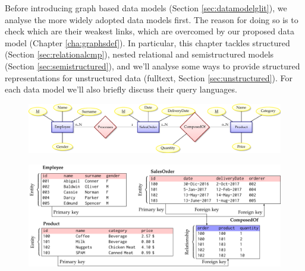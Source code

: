 Before introducing graph based data models (Section \ref{sec:datamodelglit}), we  analyse the more widely adopted data models first. The reason for doing so is to check which are their weakest links, which are overcomed by our proposed data model (Chapter \vref{cha:graphsdef}). In particular, this chapter tackles structured (Section \vref{sec:relationalcmp}), nested relational and semistructured models (Section \vref{sec:semistructured}), and we'll analyse some ways to provide structured representations for unstructured data (fulltext, Section \vref{sec:unstructured}). For each data model we'll also briefly discuss their query languages.
\begin{figure}[!pth]
	\begin{minipage}[b]{\textwidth}
		\includegraphics[scale=.6]{fig/02models/01erschema}
		\label{fig:erschema}
	\end{minipage}\quad

	\begin{minipage}[b]{\textwidth}
		\includegraphics[scale=.7]{fig/02models/02instance}
		\label{fig:instance}
	\end{minipage}


\end{figure}
